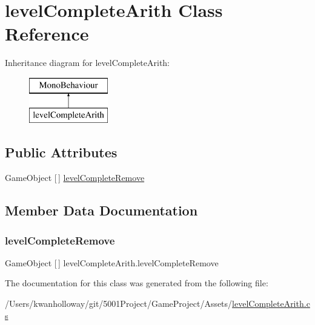 \hypertarget{classlevel_complete_arith}{}\section{level\+Complete\+Arith Class Reference}
\label{classlevel_complete_arith}
Inheritance diagram for level\+Complete\+Arith\+:\begin{figure}[H]
\begin{center}
\leavevmode
\includegraphics[height=2.000000cm]{classlevel_complete_arith}
\end{center}
\end{figure}
\subsection*{Public Attributes}
\begin{DoxyCompactItemize}
\item 
Game\+Object \mbox{[}$\,$\mbox{]} \hyperlink{classlevel_complete_arith_a821ae9580d37b6d88ada1cf8d816cca5}{level\+Complete\+Remove}
\end{DoxyCompactItemize}


\subsection{Member Data Documentation}
\mbox{\label{classlevel_complete_arith_a821ae9580d37b6d88ada1cf8d816cca5}} 
\subsubsection{\texorpdfstring{level\+Complete\+Remove}{levelCompleteRemove}}
{\footnotesize\ttfamily Game\+Object \mbox{[}$\,$\mbox{]} level\+Complete\+Arith.\+level\+Complete\+Remove}



The documentation for this class was generated from the following file\+:\begin{DoxyCompactItemize}
\item 
/\+Users/kwanholloway/git/5001\+Project/\+Game\+Project/\+Assets/\hyperlink{level_complete_arith_8cs}{level\+Complete\+Arith.\+cs}\end{DoxyCompactItemize}
